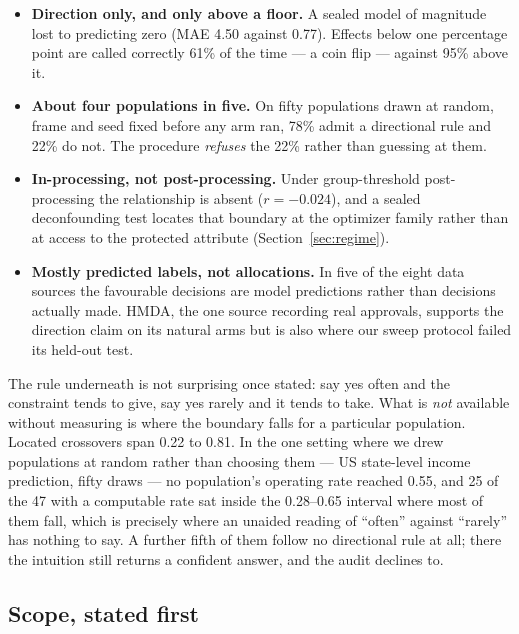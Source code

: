 \documentclass[conference]{IEEEtran}
\begin{document}
\begin{itemize}
\item \textbf{Direction only, and only above a floor.} A sealed model of magnitude lost to
predicting zero (MAE 4.50 against 0.77). Effects below one percentage point are called
correctly 61\% of the time --- a coin flip --- against 95\% above it.
\item \textbf{About four populations in five.} On fifty populations drawn at random, frame
and seed fixed before any arm ran, 78\% admit a directional rule and 22\% do not. The
procedure \emph{refuses} the 22\% rather than guessing at them.
\item \textbf{In-processing, not post-processing.} Under group-threshold post-processing
\cite{hardt2016} the relationship is absent ($r = -0.024$), and a sealed deconfounding test
locates that boundary at the optimizer family rather than at access to the protected
attribute
(Section~\ref{sec:regime}).
\item \textbf{Mostly predicted labels, not allocations.} In five of the eight data sources
the favourable decisions are model predictions rather than decisions actually made. HMDA,
the one source recording real approvals, supports the direction claim on its natural arms
but is also where our sweep protocol failed its held-out test.
\end{itemize}

The rule underneath is not surprising once stated: say yes often and the constraint tends to
give, say yes rarely and it tends to take. What is \emph{not} available without measuring is
where the boundary falls for a particular population. Located crossovers span 0.22 to 0.81. In the one setting where we drew populations at random rather than choosing them --- US
state-level income prediction, fifty draws --- no population's operating rate reached 0.55,
and 25 of the 47 with a computable rate sat inside the 0.28--0.65 interval where most of them fall, which is precisely
where an unaided reading of ``often'' against ``rarely'' has nothing to say. A further fifth
of them follow no directional rule at all; there the intuition still returns a confident
answer, and the audit declines to.

\subsection{Scope, stated first}
\label{sec:scope}
\end{document}
